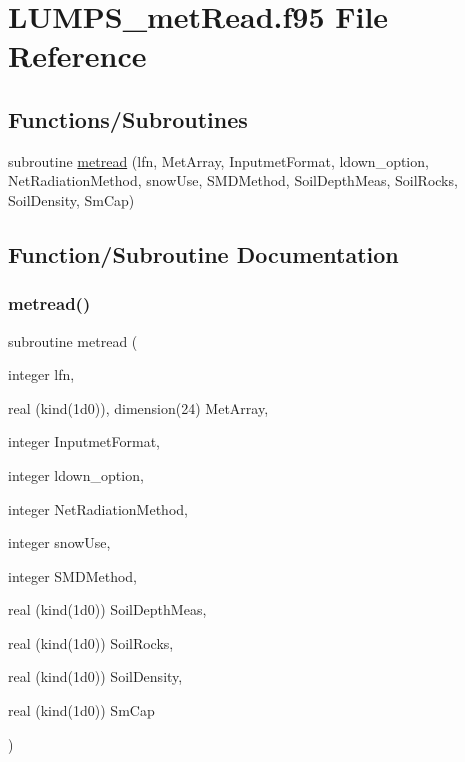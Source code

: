 \hypertarget{_l_u_m_p_s__met_read_8f95}{}\section{L\+U\+M\+P\+S\+\_\+met\+Read.\+f95 File Reference}
\label{_l_u_m_p_s__met_read_8f95}
\subsection*{Functions/\+Subroutines}
\begin{DoxyCompactItemize}
\item 
subroutine \hyperlink{_l_u_m_p_s__met_read_8f95_ad4740b76978a7e0fd6b2370afa3aeaa8}{metread} (lfn, Met\+Array, Inputmet\+Format, ldown\+\_\+option, Net\+Radiation\+Method, snow\+Use, S\+M\+D\+Method, Soil\+Depth\+Meas, Soil\+Rocks, Soil\+Density, Sm\+Cap)
\end{DoxyCompactItemize}


\subsection{Function/\+Subroutine Documentation}
\mbox{\label{_l_u_m_p_s__met_read_8f95_ad4740b76978a7e0fd6b2370afa3aeaa8}} 
\subsubsection{\texorpdfstring{metread()}{metread()}}
{\footnotesize\ttfamily subroutine metread (\begin{DoxyParamCaption}\item[{integer}]{lfn,  }\item[{real (kind(1d0)), dimension(24)}]{Met\+Array,  }\item[{integer}]{Inputmet\+Format,  }\item[{integer}]{ldown\+\_\+option,  }\item[{integer}]{Net\+Radiation\+Method,  }\item[{integer}]{snow\+Use,  }\item[{integer}]{S\+M\+D\+Method,  }\item[{real (kind(1d0))}]{Soil\+Depth\+Meas,  }\item[{real (kind(1d0))}]{Soil\+Rocks,  }\item[{real (kind(1d0))}]{Soil\+Density,  }\item[{real (kind(1d0))}]{Sm\+Cap }\end{DoxyParamCaption})}



